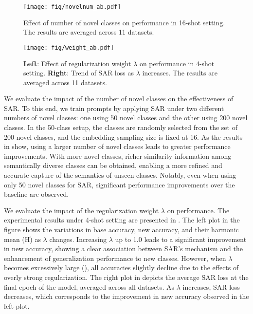 \begin{figure}[!t]
    \setlength{\abovecaptionskip}{1pt}
    \centering
    \texttt{[image: fig/novelnum\_ab.pdf]}
    \caption{Effect of number of novel classes on performance in 16-shot setting. The results are averaged across 11 datasets.}
    \label{fig:novelnum_ab}
\end{figure}

\begin{figure}[!t]
    \centering
    \texttt{[image: fig/weight\_ab.pdf]}
    \caption{\textbf{Left}: Effect of regularization weight $\lambda$ on performance in 4-shot setting. \textbf{Right}: Trend of SAR loss as $\lambda$ increases. The results are averaged across 11 datasets.}
    \label{fig:weight_ab} 
\end{figure}

We evaluate the impact of the number of novel classes on the effectiveness of SAR. To this end, we train prompts by applying SAR under two different numbers of novel classes: one using 50 novel classes and the other using 200 novel classes. In the 50-class setup, the classes are randomly selected from the set of 200 novel classes, and the embedding sampling size is fixed at 16. As the results in  show, using a larger number of novel classes leads to greater performance improvements. With more novel classes, richer similarity information among semantically diverse classes can be obtained, enabling a more refined and accurate capture of the semantics of unseen classes. Notably, even when using only 50 novel classes for SAR, significant performance improvements over the baseline are observed.

We evaluate the impact of the regularization weight $\lambda$ on performance. The experimental results under 4-shot setting are presented in . The left plot in the figure shows the variations in base accuracy, new accuracy, and their harmonic mean (H) as $\lambda$ changes. Increasing $\lambda$ up to 1.0 leads to a significant improvement in new accuracy, showing a clear association between SAR's mechanism and the enhancement of generalization performance to new classes. However, when $\lambda$ becomes excessively large (), all accuracies slightly decline due to the effects of overly strong regularization. The right plot in  depicts the average SAR loss at the final epoch of the model, averaged across all datasets. As $\lambda$ increases, SAR loss decreases, which corresponds to the improvement in new accuracy observed in the left plot.

